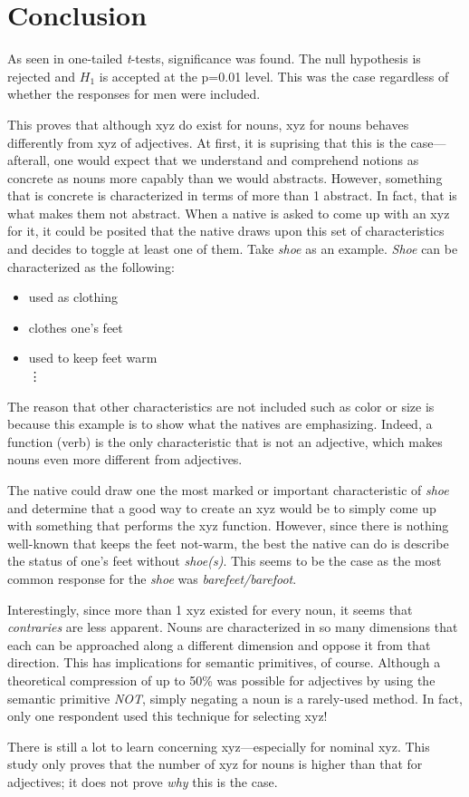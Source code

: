 \section {Conclusion}
\label{conclusion}

As seen in one-tailed \textit{t}-tests, significance was found.  The null hypothesis is rejected and $H_{1}$ is accepted at the p=0.01 level.  This was the case regardless of whether the responses for men were included.

This proves that although xyz do exist for nouns, xyz for nouns behaves differently from xyz of adjectives.  At first, it is suprising that this is the case---afterall, one would expect that we understand and comprehend notions as concrete as nouns more capably than we would abstracts.  However, something that is concrete is characterized in terms of more than 1 abstract.  In fact, that is what makes them not abstract.  When a native is asked to come up with an xyz for it, it could be posited that the native draws upon this set of characteristics and decides to toggle at least one of them.  Take \textit{shoe} as an example.  \textit{Shoe} can be characterized as the following:

\begin{itemize}
	\item used as clothing
	\item clothes one's feet
	\item used to keep feet warm \\
	\vdots
\end{itemize}

The reason that other characteristics are not included such as color or size is because this example is to show what the natives are emphasizing.  Indeed, a function (verb) is the only characteristic that is not an adjective, which makes nouns even more different from adjectives.

The native could draw one the most marked or important characteristic of \textit{shoe} and determine that a good way to create an xyz would be to simply come up with something that performs the xyz function.  However, since there is nothing well-known that keeps the feet not-warm, the best the native can do is describe the status of one's feet without \textit{shoe(s)}.  This seems to be the case as the most common response for the \textit{shoe} was \textit{barefeet/barefoot}.  

Interestingly, since more than 1 xyz existed for every noun, it seems that \textit{contraries} are less apparent.  Nouns are characterized in so many dimensions that each can be approached along a different dimension and oppose it from that direction.  This has implications for semantic primitives, of course.  Although a theoretical compression of up to 50\% was possible for adjectives by using the semantic primitive \textit{NOT}, simply negating a noun is a rarely-used method.  In fact, only one respondent used this technique for selecting xyz!

There is still a lot to learn concerning xyz---especially for nominal xyz.  This study only proves that the number of xyz for nouns is higher than that for adjectives; it does not prove \textit{why} this is the case.  